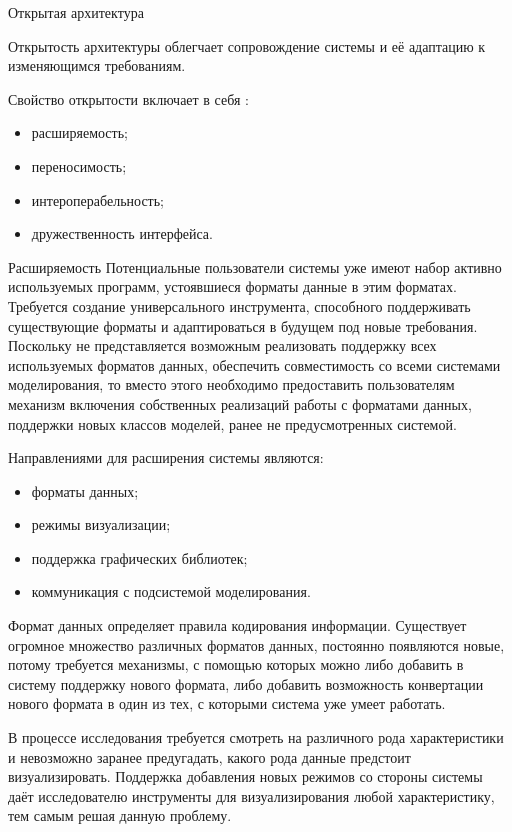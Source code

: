 \documentclass[a4paper,12pt]{extarticle}
\begin{document}
\begin{subsection}{Открытая архитектура}
    \label{sec:requirements-open}
    
    Открытость архитектуры облегчает сопровождение системы и её адаптацию к изменяющимся требованиям.

    Свойство открытости включает в себя \cite{filinov-os}:
    \begin{itemize}
        \item расширяемость;
        \item переносимость;
        \item интероперабельность;
        \item дружественность интерфейса.
    \end{itemize}

    \begin{subsubsection}{Расширяемость}
        Потенциальные пользователи системы уже имеют набор активно используемых программ, устоявшиеся форматы данные в этим форматах. Требуется создание универсального инструмента, способного поддерживать существующие форматы и адаптироваться в будущем под новые требования. Поскольку не представляется возможным реализовать поддержку всех используемых форматов данных, обеспечить совместимость со всеми системами моделирования, то вместо этого необходимо предоставить пользователям механизм включения собственных реализаций работы с форматами данных, поддержки новых классов моделей, ранее не предусмотренных системой.
        
        Направлениями для расширения системы являются:
        \begin{itemize}
            \item форматы данных;
            \item режимы визуализации;
            \item поддержка графических библиотек;
            \item коммуникация с подсистемой моделирования.
        \end{itemize}
        
        Формат данных определяет правила кодирования информации. Существует огромное множество различных форматов данных, постоянно появляются новые, потому требуется механизмы, с помощью которых можно либо добавить в систему поддержку нового формата, либо добавить возможность конвертации нового формата в один из тех, с которыми система уже умеет работать.
        
        В процессе исследования требуется смотреть на различного рода характеристики и невозможно заранее предугадать, какого рода данные предстоит визуализировать. Поддержка добавления новых режимов со стороны системы даёт исследователю инструменты для визуализирования любой характеристику, тем самым решая данную проблему.
        

\end{subsubsection}
\end{subsection}
\end{document}
